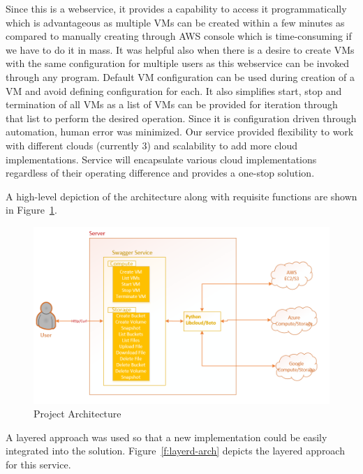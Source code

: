 Since this is a webservice, it provides a capability to access it
programmatically which is advantageous as multiple VMs can be created within a
few minutes as compared to manually creating through AWS console which is
time-consuming if we have to do it in mass. It was helpful also when there is a
desire to create VMs with the same configuration for multiple users as this
webservice can be invoked through any program. Default VM configuration can be
used during creation of a VM and avoid defining configuration for each. It also
simplifies start, stop and termination of all VMs as a list of VMs can be
provided for iteration through that list to perform the desired operation. 
Since it is configuration driven through automation, human error was minimized.
Our service provided flexibility to work with different clouds (currently 3)
and
scalability to add more cloud implementations. Service will encapsulate various
cloud implementations regardless of their operating difference and provides a
one-stop solution.

A high-level depiction of the architecture along with requisite functions are
shown in Figure~\ref{F:arch}.

\begin{figure}[!ht]
  \centering
  \includegraphics[width=\columnwidth]{images/proj-arch.png}
  \caption{Project Architecture}\label{F:arch}
\end{figure}

A layered approach was used so that a new implementation could be easily
integrated into the solution. Figure~\ref{f:layerd-arch} depicts the layered
approach for this service.

